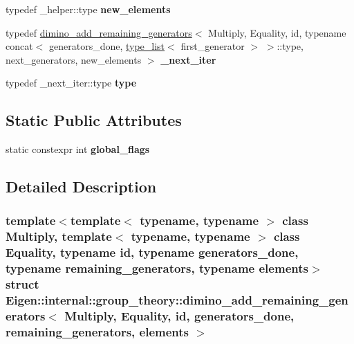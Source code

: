 \begin{DoxyCompactItemize}
\mbox{\label{struct_eigen_1_1internal_1_1group__theory_1_1dimino__add__remaining__generators_a2750668ee04c44d42663f0f17460c0b0}} 
typedef \+\_\+helper\+::type {\bfseries new\+\_\+elements}
\item 
\mbox{\label{struct_eigen_1_1internal_1_1group__theory_1_1dimino__add__remaining__generators_a766ddb0f497096d6f0a0415aa51ab267}} 
typedef \hyperlink{struct_eigen_1_1internal_1_1group__theory_1_1dimino__add__remaining__generators}{dimino\+\_\+add\+\_\+remaining\+\_\+generators}$<$ Multiply, Equality, id, typename concat$<$ generators\+\_\+done, \hyperlink{struct_eigen_1_1internal_1_1type__list}{type\+\_\+list}$<$ first\+\_\+generator $>$ $>$\+::type, next\+\_\+generators, new\+\_\+elements $>$ {\bfseries \+\_\+next\+\_\+iter}
\item 
\mbox{\label{struct_eigen_1_1internal_1_1group__theory_1_1dimino__add__remaining__generators_a446f68a9af3665750427f885a44e0633}} 
typedef \+\_\+next\+\_\+iter\+::type {\bfseries type}
\end{DoxyCompactItemize}
\subsection*{Static Public Attributes}
\begin{DoxyCompactItemize}
\item 
static constexpr int {\bfseries global\+\_\+flags}
\end{DoxyCompactItemize}


\subsection{Detailed Description}
\subsubsection*{template$<$template$<$ typename, typename $>$ class Multiply, template$<$ typename, typename $>$ class Equality, typename id, typename generators\+\_\+done, typename remaining\+\_\+generators, typename elements$>$\newline
struct Eigen\+::internal\+::group\+\_\+theory\+::dimino\+\_\+add\+\_\+remaining\+\_\+generators$<$ Multiply, Equality, id, generators\+\_\+done, remaining\+\_\+generators, elements $>$}



